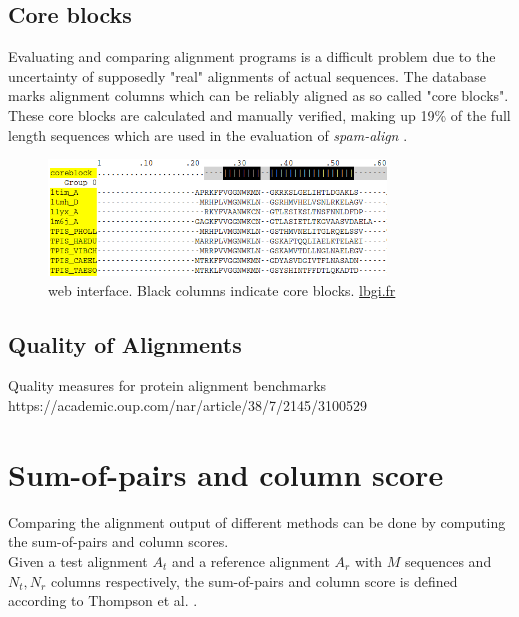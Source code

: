 \subsection{Core blocks}

Evaluating and comparing alignment programs is a difficult problem due to the uncertainty of supposedly "real" alignments of actual sequences. The \bb database  marks alignment columns which can be reliably aligned as so called "core blocks". These core blocks are calculated and manually verified, making up 19\% of the full length sequences which are used in the evaluation of \textit{spam-align} \cite{thompson2005balibase}.


\begin{figure}[h]
	\centering
	\includegraphics[width=0.8\textwidth]{./images/balibase-web.png}
	\caption{\bb web interface. Black columns indicate core blocks. \href{www.lbgi.fr/wscoperr?Balibase&FileMoi&macsimHtml&BB20006}{lbgi.fr}}
	\label{}
\end{figure}

\subsection{Quality of Alignments}

Quality measures for protein alignment benchmarks \\
https://academic.oup.com/nar/article/38/7/2145/3100529


\section{Sum-of-pairs and column score}
Comparing the alignment output of different methods can be done by computing the sum-of-pairs and column scores.\\
Given a test alignment $A_t$ and a reference alignment $A_r$ with $M$ sequences and $N_t, N_r$ columns respectively, the sum-of-pairs and column score is defined according to Thompson et al. \cite{thompson1999comprehensive}.

